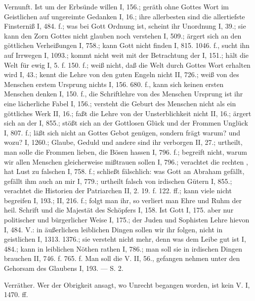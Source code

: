Vernunft. Ist  um der Erbsünde willen I, 156.; geräth ohne Gottes Wort im Geistlichen auf ungereimte Gedanken I, 16.; ihre allerbesten  sind die allertiefste Finsterniß I, 484. f.; was bei Gott Ordnung ist, scheint ihr Unordnung I, 39.; sie kann den Zorn Gottes nicht glauben noch verstehen I, 509.; ärgert sich an den göttlichen Verheißungen I, 758.; kann Gott nicht finden I, 815. 1046. f., sucht ihn auf Irrwegen I, 1093.; kommt nicht weit mit der Betrachtung der  I, 151.; hält die Welt für ewig I, 5. f. 150. f.; weiß nicht, daß die Welt durch Gottes Wort erhalten wird I, 43.; kennt die Lehre von den guten Engeln nicht II, 726.; weiß von des Menschen erstem Ursprung nichts I, 156. 680. f., kann sich keinen ersten Menschen denken I, 150. f., die Schriftlehre von des Menschen Ursprung ist ihr eine lächerliche Fabel I, 156.; versteht die Geburt des Menschen nicht als ein göttliches Werk II, 16.; faßt die Lehre von der Unsterblichkeit nicht II, 16.; ärgert sich an der  I, 855.; stößt sich an der Gottlosen Glück und der Frommen Unglück I, 807. f.; läßt sich nicht an Gottes Gebot genügen, sondern frägt warum? und wozu? I, 1260.; Glaube, Geduld und andere  sind ihr verborgen II, 27.; urtheilt, man solle die Frommen lieben, die Bösen hassen I, 796. f.; begreift nicht, warum wir allen Menschen gleicherweise mißtrauen sollen I, 796.; verachtet die rechten , hat Lust zu falschen I, 758. f.; schließt fälschlich: was Gott an Abraham gefällt, gefällt ihm auch an mir I, 779.; urtheilt falsch von irdischen Gütern I, 855.; verachtet die Historien der Patriarchen II, 2. 19. f. 122. ff.; kann viele  nicht begreifen I, 193.; II, 216. f.; folgt man ihr, so verliert man Ehre und Ruhm der heil. Schrift und die Majestät des Schöpfers I, 158. Ist Gott  I, 175.  aber nur politischer und bürgerlicher Weise I, 175.; der Juden und Sophisten Lehre hievon I, 484.  V.: in äußerlichen leiblichen Dingen sollen wir ihr folgen, nicht in geistlichen I, 1313. 1376.; sie versteht nicht mehr, denn was dem Leibe gut ist I, 484.; kann in leiblichen Nöthen rathen I, 786.; man soll sie in irdischen Dingen brauchen II, 746. f. 765. f. Man soll die V.  II, 56., gefangen nehmen unter den Gehorsam des Glaubens I, 193. — S.  2.

Verräther. Wer der Obrigkeit ansagt, wo Unrecht begangen worden, ist kein V. I, 1470. ff.

